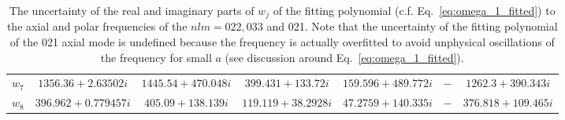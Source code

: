 \documentclass[aps,prx,amsmath,floats,floatfix,twocolumn,
  superscriptaddress,nofootinbib,showpacs]{revtex4-1}
\begin{document}
\begin{table}[]
{\begin{tabular}{c|cc|cc|cc|}
$w_7$                  & \multicolumn{1}{c|}{$1356.36+2.63502i$}      & $ 1445.54+470.048i $     & \multicolumn{1}{c|}{$399.431+133.72i $}   & $159.596+489.772i $    & \multicolumn{1}{c|}{$- $} &  {$1262.3+390.343i $}      \\ 
$w_8$                  & \multicolumn{1}{c|}{$396.962+0.779457i$}      & $ 405.09+138.139i $     & \multicolumn{1}{c|}{$119.119+38.2928i $}   & $47.2759+140.335i $    & \multicolumn{1}{c|}{$- $} &  {$376.818 +109.465i $}    \\ \hline
\end{tabular}
}
\caption{
\label{tab:poly_fit_coeffs_uncertainty}
The uncertainty of the real and imaginary parts of $w_j$ of the fitting polynomial (c.f. Eq.~\eqref{eq:omega_1_fitted}) to the axial and polar frequencies of the $nlm=022, 033$ and 021.
Note that the uncertainty of the fitting polynomial of the 021 axial mode is undefined because the frequency is actually overfitted to avoid unphysical oscillations of the frequency for small $a$ (see discussion around Eq.~\eqref{eq:omega_1_fitted}). }
\end{table}



\end{document}
